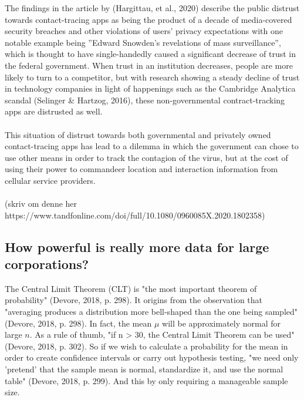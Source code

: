 \documentclass[11pt]{article}
\begin{document}
The findings in the article by (Hargittau, et al., 2020) describe the public distrust towards contact-tracing apps as being the product of a decade of media-covered security breaches and other violations of users’ privacy expectations with one notable example being ”Edward Snowden’s revelations of mass surveillance”, which is thought to have single-handedly caused a significant decrease of trust in the federal government. When trust in an institution decreases, people are more likely to turn to a competitor, but with research showing a steady decline of trust in technology companies in light of happenings such as the Cambridge Analytica scandal (Selinger \& Hartzog, 2016), these non-governmental contract-tracking apps are distrusted as well. \\ \\

 

This situation of distrust towards both governmental and privately owned contact-tracing apps has lead to a dilemma in which the government can chose to use other means in order to track the contagion of the virus, but at the cost of using their power to commandeer location and interaction information from cellular service providers. \\ \\

(skriv om denne her https://www.tandfonline.com/doi/full/10.1080/0960085X.2020.1802358) 

\subsection{How powerful is really more data for large corporations?}
The Central Limit Theorem (CLT) is "the most important theorem of probability" (Devore, 2018, p. 298). It origins from the observation that "averaging produces a distribution more bell-shaped than the one being sampled" (Devore, 2018, p. 298). In fact, the mean $\mu$ will be approximately normal for large $n$. As a rule of thumb, "if n > 30, the Central Limit Theorem can be used" (Devore, 2018, p. 302). So if we wish to calculate a probability for the mean in order to create confidence intervals or carry out hypothesis testing, "we need only 'pretend' that the sample mean is normal, standardize it, and use the normal table" (Devore, 2018, p. 299). And this by only requiring a manageable sample size. \\ \\
\end{document}
